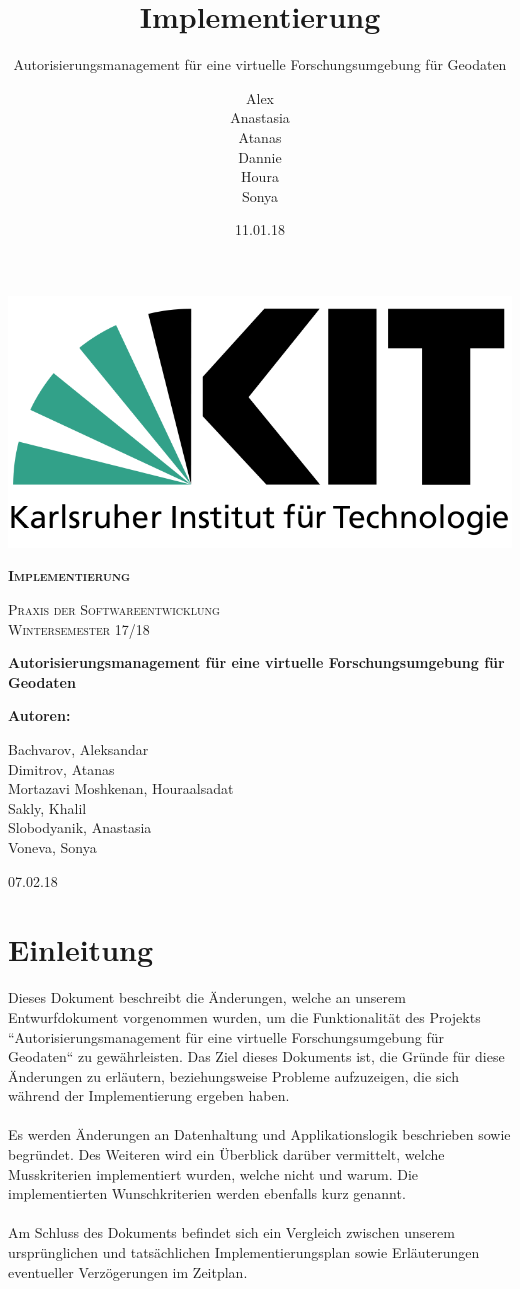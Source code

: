 \documentclass[parskip=full,11pt]{scrartcl}
\title{Implementierung}
\subtitle{Autorisierungsmanagement für eine virtuelle Forschungsumgebung für Geodaten}
\author{Alex\\Anastasia\\Atanas\\Dannie\\ Houra\\Sonya\\}
\date{11.01.18}
\begin{document}
 
 \begin{titlepage}
 	
 	\begin{center}
 	\includegraphics[width=0.5\linewidth]{res/KITLogo.png}\\
 	\vspace{2cm}
 	{\scshape\LARGE\bfseries Implementierung \par}
 	\vspace{0.5cm}
 	{\scshape\Large Praxis der Softwareentwicklung\\}
 	\vspace{1cm}
 	{\scshape\Large Wintersemester 17/18\\}
 	\vspace{2cm}
 	{\huge\bfseries Autorisierungsmanagement für eine virtuelle Forschungsumgebung für Geodaten\par}
 	\vspace{2cm}
 	\vfill
 	{\bfseries {\Large Autoren}:\par}
 	{\Large Bachvarov, Aleksandar }\\
 	{\Large Dimitrov, Atanas }\\
 	{\Large Mortazavi Moshkenan, Houraalsadat }\\
 	{\Large Sakly, Khalil }\\
 	{\Large Slobodyanik, Anastasia }\\
 	{\Large Voneva, Sonya}\\
 	\vfill
 	{\large 07.02.18 \par}
 	\end{center}
 \end{titlepage}
 
 \tableofcontents
 \newpage
 \section{Einleitung}
Dieses Dokument beschreibt die Änderungen, welche an unserem Entwurfdokument vorgenommen wurden, um die Funktionalität des Projekts ``Autorisierungsmanagement für eine virtuelle Forschungsumgebung für Geodaten`` zu gewährleisten. Das Ziel dieses Dokuments ist, die Gründe für diese Änderungen zu erläutern, beziehungsweise Probleme aufzuzeigen, die sich während der Implementierung ergeben haben.\\\\
Es werden Änderungen an Datenhaltung und Applikationslogik beschrieben sowie begründet. Des Weiteren wird ein Überblick darüber vermittelt, welche Musskriterien implementiert wurden, welche nicht und warum. Die implementierten Wunschkriterien werden ebenfalls kurz genannt.\\\\
Am Schluss des Dokuments befindet sich ein Vergleich zwischen unserem ursprünglichen und tatsächlichen Implementierungsplan sowie Erläuterungen eventueller Verzögerungen im Zeitplan.
\end{document}
